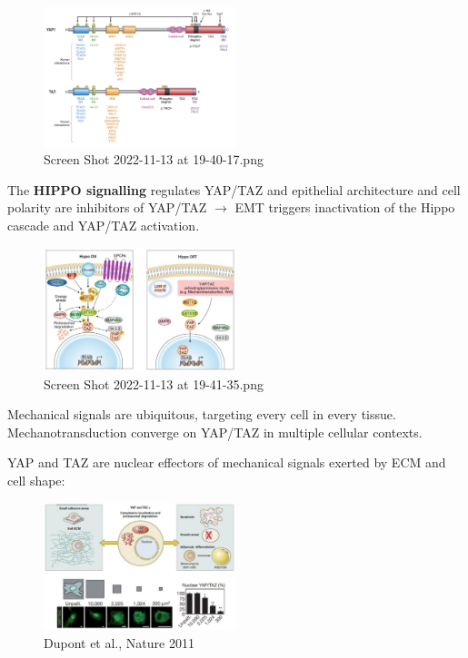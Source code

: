 \begin{figure}
\centering
\includegraphics[width=0.5\textwidth]{../_resources/Screen_Shot_2022-11-13_at_19-40-17.png}
\caption{Screen Shot 2022-11-13 at 19-40-17.png}
\end{figure}

The \textbf{HIPPO signalling} regulates YAP/TAZ and epithelial architecture and cell polarity are inhibitors of YAP/TAZ $\rightarrow$ EMT triggers inactivation of the Hippo cascade and YAP/TAZ activation.

\begin{figure}
\centering
\includegraphics[width=0.5\textwidth]{../_resources/Screen_Shot_2022-11-13_at_19-41-35.png}
\caption{Screen Shot 2022-11-13 at 19-41-35.png}
\end{figure}

Mechanical signals are ubiquitous, targeting every cell in every tissue. Mechanotransduction converge on YAP/TAZ in multiple cellular contexts.

YAP and TAZ are nuclear effectors of mechanical signals exerted by ECM and cell shape:

\begin{figure}
\centering
\includegraphics[width=0.5\textwidth]{../_resources/Screen_Shot_2022-11-13_at_19-43-07.png}
\caption{Dupont et al., Nature 2011}
\end{figure}


